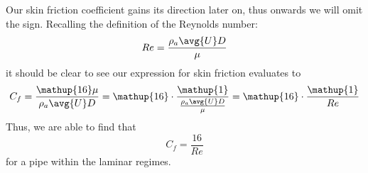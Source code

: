 Our skin friction coefficient gains its direction later on, thus onwards we will omit the sign. Recalling the definition of the Reynolds number:
\begin{equation}
    Re = \frac{\rho_a \avg{U} D}{\mu}
\end{equation}
it should be clear to see our expression for skin friction evaluates to
\begin{equation}
    C_f = \frac{\mathup{16}\mu}{\rho_a \avg{U} D} = \mathup{16}\cdot\frac{\mathup{1}}{\frac{\rho_a \avg{U}D}{\mu}} = \mathup{16} \cdot \frac{\mathup{1}}{Re}
\end{equation}
Thus, we are able to find that
\begin{equation}
    C_f = \frac{\mathup{16}}{Re}
\end{equation}
for a pipe within the laminar regimes.
\newpage

